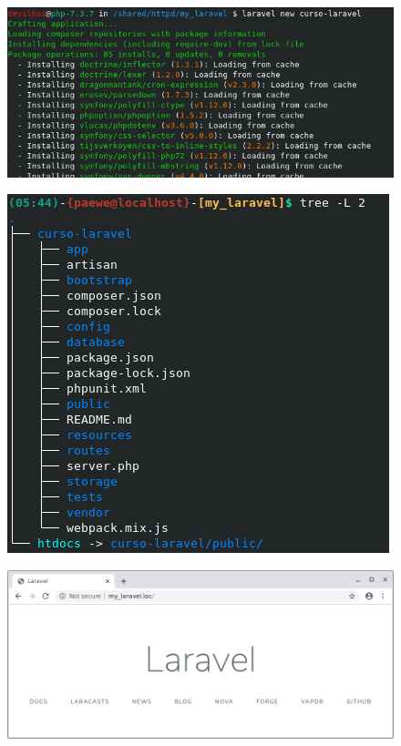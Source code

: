 \documentclass{article}
\begin{document}
\begin{figure}[h!]
  \centering
  \includegraphics[scale=0.75]{./Pictures/001_Install_laravel.png}
\end{figure}

\begin{figure}[h!]
  \centering
  \includegraphics[scale=0.65]{./Pictures/002_estructura.png}
\end{figure}

\newpage

\begin{figure}[h!]
  \centering
  \includegraphics[scale=0.5]{./Pictures/003_laravel.png}
\end{figure}
\end{document}
